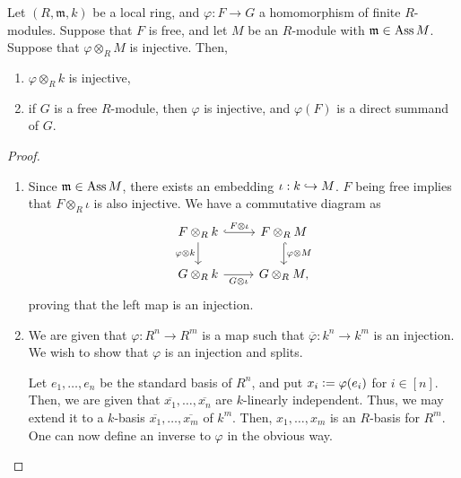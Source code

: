 \documentclass[12pt]{article}
\begin{document}
\begin{lem} \label{lem:injective-associated-tensor}
	Let $(R, \mathfrak{m}, k)$ be a local ring, and $\varphi : F \to G$ a homomorphism of finite $R$-modules. Suppose that $F$ is free, and let $M$ be an $R$-module with $\mathfrak{m} \in \operatorname{Ass} M$. Suppose that $\varphi \otimes_{R} M$ is injective. Then,
	\begin{enumerate}[label=(\alph*)]
		\item $\varphi \otimes_{R} k$ is injective,
		\item if $G$ is a free $R$-module, then $\varphi$ is injective, and $\varphi(F)$ is a direct summand of $G$.
	\end{enumerate}
\end{lem}
\begin{proof} \phantom{h}
	\begin{enumerate}[label=(\alph*)]
		\item Since $\mathfrak{m} \in \operatorname{Ass} M$, there exists an embedding $\iota : k \hookrightarrow M$. $F$ being free implies that $F \otimes_{R} \iota$ is also injective. We have a commutative diagram as
		\begin{equation*} 
			\begin{tikzcd}
				F \otimes_{R} k \arrow[d, "\varphi \otimes k"'] \arrow[r, "F \otimes \iota", hook] & F \otimes_{R} M \arrow[d, "\varphi \otimes M", hook] \\
				G \otimes_{R} k \arrow[r, "G \otimes \iota"'] & G \otimes_{R} M,
			\end{tikzcd}
		\end{equation*}
		proving that the left map is an injection.
		\item We are given that $\varphi : R^{n} \to R^{m}$ is a map such that $\overline{\varphi} : k^{n} \to k^{m}$ is an injection. \newline
		We wish to show that $\varphi$ is an injection and splits. 

		Let $e_{1}, \ldots, e_{n}$ be the standard basis of $R^{n}$, and put $x_{i} \vcentcolon= \varphi(e_{i})$ for $i \in [n]$. Then, we are given that $\overline{x_{1}}, \ldots, \overline{x_{n}}$ are $k$-linearly independent. Thus, we may extend it to a $k$-basis $\overline{x_{1}}, \ldots, \overline{x_{m}}$ of $k^{m}$. Then, $x_{1}, \ldots, x_{m}$ is an $R$-basis for $R^{m}$. One can now define an inverse to $\varphi$ in the obvious way. \qedhere
	\end{enumerate}
\end{proof}
\end{document}
